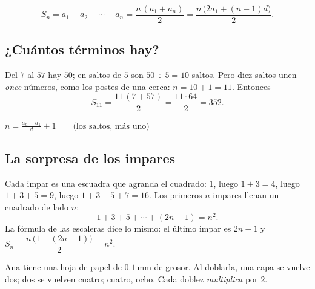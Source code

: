 \documentclass[11pt,a4paper]{article}
\begin{document}
\begin{propiedad}
\[ S_n=a_1+a_2+\cdots+a_n=\frac{n\,(a_1+a_n)}{2}=\frac{n\,\bigl(2a_1+(n-1)d\bigr)}{2}. \]
\end{propiedad}

\subsection{¿Cuántos términos hay?}
\begin{ejemplo}[$7+12+17+\cdots+57$]
Del $7$ al $57$ hay $50$; en saltos de $5$ son $50\div5=10$ saltos. Pero diez saltos unen \emph{once} números, como
los postes de una cerca: $n=10+1=11$. Entonces
\[ S_{11}=\frac{11\,(7+57)}{2}=\frac{11\cdot 64}{2}=352 . \]
\end{ejemplo}
\begin{clavebox}
$\displaystyle n=\frac{a_n-a_1}{d}+1\qquad\text{(los saltos, más uno)}$
\end{clavebox}

\subsection{La sorpresa de los impares}
\begin{minipage}[c]{0.64\linewidth}
Cada impar es una escuadra que agranda el cuadrado: $1$, luego $1+3=4$, luego $1+3+5=9$, luego $1+3+5+7=16$.
Los primeros $n$ impares llenan un cuadrado de lado $n$:
\[ 1+3+5+\cdots+(2n-1)=n^2 . \]
La fórmula de las escaleras dice lo mismo: el último impar es $2n-1$ y
$S_n=\dfrac{n\,\bigl(1+(2n-1)\bigr)}{2}=n^2$.
\end{minipage}\hfill
\begin{minipage}[c]{0.3\linewidth}\centering
{}
\end{minipage}



Ana tiene una hoja de papel de $\SI{0.1}{\milli\metre}$ de grosor. Al doblarla, una capa se vuelve dos; dos se vuelven
cuatro; cuatro, ocho. Cada doblez \emph{multiplica} por $2$.
\end{document}
